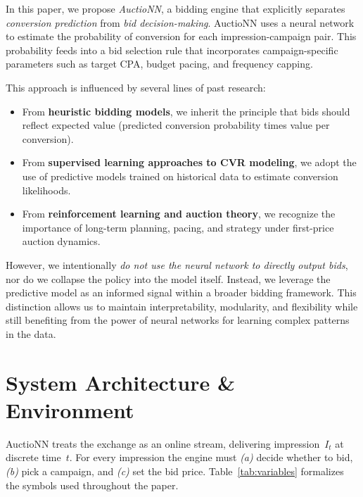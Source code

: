 \documentclass[11pt]{article}
\begin{document}
In this paper, we propose \emph{AuctioNN}, a bidding engine that explicitly separates \emph{conversion prediction} from \emph{bid decision-making}. AuctioNN uses a neural network to estimate the probability of conversion for each impression-campaign pair. This probability feeds into a bid selection rule that incorporates campaign-specific parameters such as target CPA, budget pacing, and frequency capping.

This approach is influenced by several lines of past research:

\begin{itemize}
    \item From \textbf{heuristic bidding models}, we inherit the principle that bids should reflect expected value (predicted conversion probability times value per conversion).
    \item From \textbf{supervised learning approaches to CVR modeling}, we adopt the use of predictive models trained on historical data to estimate conversion likelihoods.
    \item From \textbf{reinforcement learning and auction theory}, we recognize the importance of long-term planning, pacing, and strategy under first-price auction dynamics.
\end{itemize}

However, we intentionally \emph{do not use the neural network to directly output bids}, nor do we collapse the policy into the model itself. Instead, we leverage the predictive model as an informed signal within a broader bidding framework. This distinction allows us to maintain interpretability, modularity, and flexibility while still benefiting from the power of neural networks for learning complex patterns in the data.

\section{System Architecture \& Environment}\label{sec:env}

AuctioNN treats the exchange as an online stream, delivering
impression~$I_t$ at discrete time~$t$.
For every impression the engine must
\emph{(a)} decide whether to bid,
\emph{(b)} pick a campaign, and
\emph{(c)} set the bid price.
Table~\ref{tab:variables} formalizes the symbols used throughout the paper.
\end{document}
